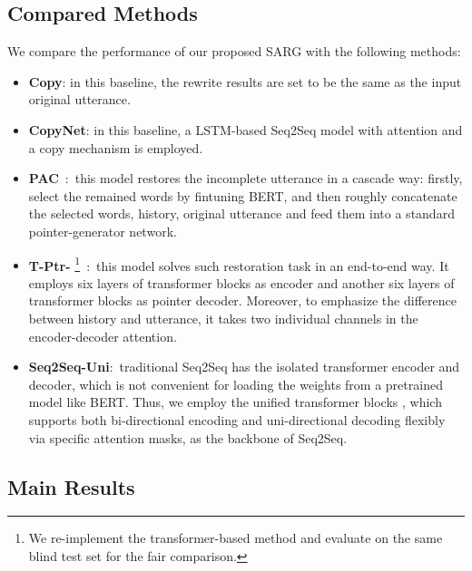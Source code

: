 \subsection{Compared Methods}
We compare the performance of our proposed SARG with the following methods:
\begin{itemize}
	\item \textbf{Copy}: in this baseline, the rewrite results are set to be the same as the input original utterance.
	
	\item \textbf{CopyNet}: in this baseline, a LSTM-based Seq2Seq model with attention and a copy mechanism is employed.
	
	\item \textbf{PAC}\ \cite{pan2019improving}:\ this model restores the incomplete utterance in a cascade way: firstly, select the remained words by fintuning BERT, and then roughly concatenate the selected words, history, original utterance and feed them into a standard pointer-generator network.
	
	\item \textbf{T-Ptr-} \footnote{We re-implement the transformer-based method and evaluate on the same blind test set for the fair comparison.}\ \cite{su2019improving}:\ this model solves such restoration task in an end-to-end way. It employs six layers of transformer blocks as encoder and another six layers of transformer blocks as pointer decoder. Moreover, to emphasize the difference between history and utterance, it takes two individual channels in the encoder-decoder attention.
	
	\item \textbf{Seq2Seq-Uni}:\ traditional Seq2Seq has the isolated transformer encoder and decoder, which is not convenient for loading the weights from a pretrained model like BERT. Thus, we employ the unified transformer blocks \cite{dong2019unified}, which supports both bi-directional encoding and uni-directional decoding flexibly via specific attention masks, as the backbone of Seq2Seq. 
\end{itemize}

\subsection{Main Results}

